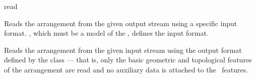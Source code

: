 
\ccRefPageBegin

\begin{ccRefFunction}{read}


   {Reads the arrangement  from the given output stream using a specific
    input format. , which must be a model of the
    , defines the input format.}

   {Reads the arrangement  from the given input stream using the
    output format defined by the  class --- that is,
    only the basic geometric and topological features of the arrangement are
    read and no auxiliary data is attached to the \dcel\ features.}

\end{ccRefFunction}

\ccRefPageEnd
